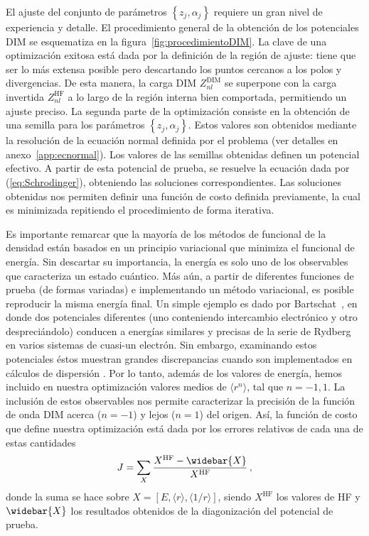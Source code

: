 El ajuste del conjunto de parámetros $\left\{z_j,\alpha_j\right\}$ 
requiere un gran nivel de experiencia y detalle. El procedimiento 
general de la obtención de los potenciales DIM se esquematiza en la 
figura~\ref{fig:procedimientoDIM}. La clave de una optimización exitosa 
está dada por la definición de la región de ajuste: tiene que ser lo más 
extensa posible pero descartando los puntos cercanos a los polos y 
divergencias. De esta manera, la carga DIM $Z_{nl}^{\mathrm{DIM}}$ se 
superpone con la carga invertida $Z_{nl}^{\mathrm{HF}}$ a lo largo de 
la región interna bien comportada, permitiendo un ajuste preciso. La 
segunda parte de la optimización consiste en la obtención de una semilla 
para los parámetros $\left\{z_j,\alpha_j\right\}$. Estos valores son 
obtenidos mediante la resolución de la ecuación normal definida por el 
problema (ver detalles en anexo~\ref{app:ecnormal}). Los valores de las 
semillas obtenidas definen un potencial efectivo. A partir de esta 
potencial de prueba, se resuelve la ecuación dada por 
(\ref{eq:Schrodinger}), obteniendo las soluciones correspondientes. Las 
soluciones obtenidas nos permiten definir una función de costo definida 
previamente, la cual es minimizada repitiendo el procedimiento de forma 
iterativa. 

Es importante remarcar que la mayoría de los métodos de funcional de 
la densidad están basados en un principio variacional que minimiza el
funcional de energía. Sin descartar su importancia, la energía es solo
uno de los observables que caracteriza un estado cuántico. Más aún, a 
partir de diferentes funciones de prueba (de formas variadas) e 
implementando un método variacional, es posible reproducir la misma 
energía final. Un simple ejemplo es dado por 
Bartschat~\cite{Albright:93,Bartschat:96}, en donde dos potenciales
diferentes (uno conteniendo intercambio electrónico y otro despreciándolo)
conducen a energías similares y precisas de la serie de Rydberg en 
varios sistemas de cuasi-un electrón. Sin embargo, examinando estos 
potenciales éstos muestran grandes discrepancias cuando son implementados
en cálculos de dispersión \cite{BartschatBray:96}. Por lo tanto, además
de los valores de energía, hemos incluido en nuestra optimización 
valores medios de $\langle r^{n} \rangle$, tal que $n=-1,1$. La inclusión
de estos observables nos permite caracterizar la precisión de la función
de onda DIM acerca ($n=-1$) y lejos ($n=1$) del origen. Así, la función 
de costo que define nuestra optimización está dada por los errores 
relativos de cada una de estas cantidades
\begin{equation}
J=\sum_X \frac{X^{\mathrm{HF}}-\widebar{X}}{X^{\mathrm{HF}}}\,,
\end{equation}
donde la suma se hace sobre $X=\left[E,\langle r \rangle,\langle 1/r \rangle\right]$,
siendo $X^{\mathrm{HF}}$ los valores de HF y $\widebar{X}$ los 
resultados obtenidos de la diagonización del potencial de prueba. 

